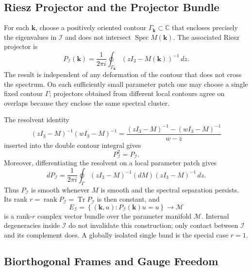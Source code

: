 \documentclass[11pt]{article}
\numberwithin{equation}{section}
\begin{document}
\subsection{Riesz Projector and the Projector Bundle}

For each $\mathbf k$, choose a positively oriented contour
$\Gamma_{\mathbf k}\subset\mathbb C$ that encloses precisely the
eigenvalues in $\mathcal I$ and does not intersect
$\operatorname{Spec}M(\mathbf k)$. The associated Riesz projector is
\begin{equation}
  P_{\mathcal I}(\mathbf k)=\frac{1}{2\pi i}
  \oint_{\Gamma_{\mathbf k}}
  (zI_3-M(\mathbf k))^{-1}\,dz .
  \label{eq:riesz_projection}
\end{equation}
The result is independent of any deformation of the contour that does not
cross the spectrum. On each sufficiently small parameter patch one may
choose a single fixed contour $\Gamma$; projectors obtained from different
local contours agree on overlaps because they enclose the same spectral
cluster.

The resolvent identity
\begin{equation}
  (zI_3-M)^{-1}(wI_3-M)^{-1}
  =\frac{(zI_3-M)^{-1}-(wI_3-M)^{-1}}{w-z}
\end{equation}
inserted into the double contour integral gives
\begin{equation}
  P_{\mathcal I}^2=P_{\mathcal I}.
  \label{eq:projector_idempotency}
\end{equation}
Moreover, differentiating the resolvent on a local parameter patch gives
\begin{equation}
  dP_{\mathcal I}=\frac{1}{2\pi i}
  \oint_{\Gamma}
  (zI_3-M)^{-1}(dM)(zI_3-M)^{-1}\,dz .
  \label{eq:riesz_derivative}
\end{equation}
Thus $P_{\mathcal I}$ is smooth whenever $M$ is smooth and the spectral
separation persists. Its rank
$r=\operatorname{rank}P_{\mathcal I}=\operatorname{Tr}P_{\mathcal I}$ is
then constant, and
\begin{equation}
  E_{\mathcal I}=\left\{
  (\mathbf k,u):P_{\mathcal I}(\mathbf k)u=u
  \right\}
  \longrightarrow\mathcal M
  \label{eq:projector_bundle}
\end{equation}
is a rank-$r$ complex vector bundle over the parameter manifold
$\mathcal M$. Internal degeneracies inside $\mathcal I$ do not invalidate
this construction; only contact between $\mathcal I$ and its complement
does. A globally isolated single band is the special case $r=1$.

\subsection{Biorthogonal Frames and Gauge Freedom}
\end{document}
